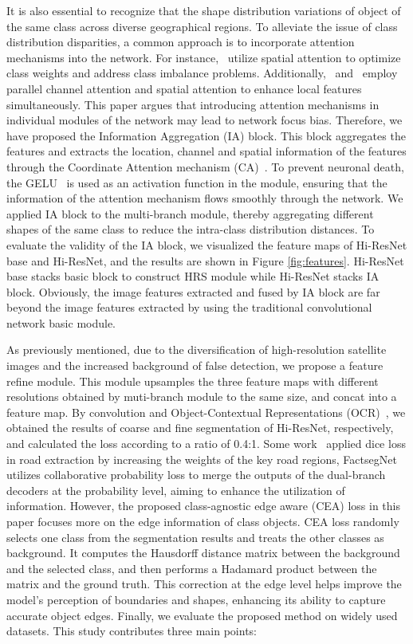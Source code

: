 \documentclass[journal]{IEEEtran}
\begin{document}
It is also essential to recognize that the shape distribution variations of object of the same class across diverse geographical regions.
To alleviate the issue of class distribution disparities, a common approach is to incorporate attention mechanisms into the network.
For instance,~\cite{woo2018cbam,chen2021remote,chen2022gcsanet} utilize spatial attention to optimize class weights and address class imbalance problems. Additionally,~\cite{bi2021local} and~\cite{zhao2020residual} employ parallel channel attention and spatial attention to enhance local features simultaneously.
This paper argues that introducing attention mechanisms in individual modules of the network may lead to network focus bias. Therefore, we have proposed the Information Aggregation (IA) block. This block aggregates the features and extracts the location, channel and spatial information of the features through the Coordinate Attention mechanism (CA)~\cite{hou2021coordinate}. To prevent neuronal death, the GELU~\cite{hendrycks2016gaussian} is used as an activation function in the module, ensuring that the information of the attention mechanism flows smoothly through the network.
We applied IA block to the multi-branch module, thereby aggregating different shapes of the same class to reduce the intra-class distribution distances. To evaluate the validity of the IA block, we visualized the feature maps of Hi-ResNet base and Hi-ResNet, and the results are shown in Figure \ref{fig:features}. Hi-ResNet base stacks basic block to construct HRS module while Hi-ResNet stacks IA block. Obviously, the image features extracted and fused by IA block are far beyond the image features extracted by using the traditional convolutional network basic module.

As previously mentioned, due to the diversification of high-resolution satellite images and the increased background of false detection, we propose a feature refine module. This module upsamples the three feature maps with different resolutions obtained by muti-branch module to the same size, and concat into a feature map. By convolution and Object-Contextual Representations (OCR)~\cite{yuan2019segmentation}, we obtained the results of coarse and fine segmentation of Hi-ResNet, respectively, and calculated the loss according to a ratio of 0.4:1. Some work~\cite{zhou2018d,lin2020road} applied dice loss in road extraction by increasing the weights of the key road regions, FactsegNet~\cite{ma2021factseg} utilizes collaborative probability loss to merge the outputs of the dual-branch decoders at the probability level, aiming to enhance the utilization of information.
However, the proposed class-agnostic edge aware (CEA) loss in this paper focuses more on the edge information of class objects. CEA loss randomly selects one class from the segmentation results and treats the other classes as background. It computes the Hausdorff distance matrix between the background and the selected class, and then performs a Hadamard product between the matrix and the ground truth. This correction at the edge level helps improve the model's perception of boundaries and shapes, enhancing its ability to capture accurate object edges.
Finally, we evaluate the proposed method on widely used datasets. This study contributes three main points:
\end{document}
